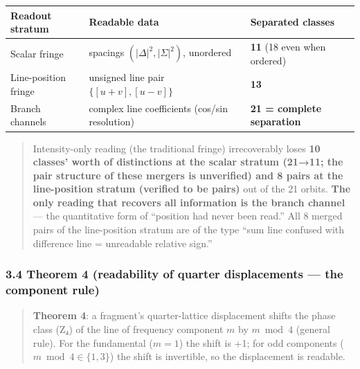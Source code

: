 \documentclass[
]{article}
\newcounter{none} %
\begin{document}
{\def\LTcaptype{none} %
\begin{longtable}[]{@{}
  >{\raggedright\arraybackslash}p{}
  >{\raggedright\arraybackslash}p{}
  >{\raggedright\arraybackslash}p{}@{}}
\toprule\noalign{}
\begin{minipage}[b]{\linewidth}\raggedright
Readout stratum
\end{minipage} & \begin{minipage}[b]{\linewidth}\raggedright
Readable data
\end{minipage} & \begin{minipage}[b]{\linewidth}\raggedright
Separated classes
\end{minipage} \\
\midrule\noalign{}
\endhead
\bottomrule\noalign{}
\endlastfoot
Scalar fringe & spacings \((|\Delta|^2,|\Sigma|^2)\), unordered &
\textbf{11} (18 even when ordered) \\
Line-position fringe & unsigned line pair \(\{[u{+}v],[u{-}v]\}\) &
\textbf{13} \\
Branch channels & complex line coefficients (cos/sin resolution) &
\textbf{21 = complete separation} \\
\end{longtable}
}

\begin{quote}
Intensity-only reading (the traditional fringe) irrecoverably loses
\textbf{10 classes' worth of distinctions at the scalar stratum (21→11;
the pair structure of these mergers is unverified) and 8 pairs at the
line-position stratum (verified to be pairs)} out of the 21 orbits.
\textbf{The only reading that recovers all information is the branch
channel} --- the quantitative form of ``position had never been read.''
All 8 merged pairs of the line-position stratum are of the type ``sum
line confused with difference line = unreadable relative sign.''
\end{quote}

\subsubsection{3.4 Theorem 4 (readability of quarter displacements ---
the component
rule)}\label{theorem-4-readability-of-quarter-displacements-the-component-rule}

\begin{quote}
\textbf{Theorem 4}: a fragment's quarter-lattice displacement shifts the
phase class (Z₄) of the line of frequency component \(m\) by
\textbf{\(m\bmod4\)} (general rule). For the fundamental (\(m=1\)) the
shift is +1; for odd components (\(m\bmod4\in\{1,3\}\)) the shift is
invertible, so the displacement is readable.
\end{quote}
\end{document}
